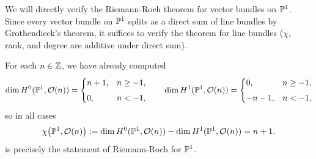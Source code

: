 \documentclass[12pt]{article}
\begin{document}
\begin{example}
     We will directly verify the Riemann-Roch theorem for vector bundles on $\P^1$. Since every vector bundle on $\P^1$ splits as a direct sum of line bundles by Grothendieck's theorem, it suffices to verify the theorem for line bundles ($\chi$, rank, and degree are additive under direct sum).


    For each $n\in\Z$, we have already computed
    \[
        \dim H^{0}(\P^{1},\cO(n)) =
        \begin{cases}
            n+1, & n\ge -1, \\[4pt]
            0,   & n<-1,
        \end{cases}
        \qquad
        \dim H^{1}(\P^{1},\cO(n)) =
        \begin{cases}
            0,    & n\ge -1, \\[4pt]
            -n-1, & n<-1,
        \end{cases}
    \]
    so in all cases
    \[
        \chi\bigl(\P^{1},\cO(n)\bigr)
        := \dim H^{0}(\P^{1},\cO(n)) - \dim H^{1}(\P^{1},\cO(n))
        = n+1.
    \]
    is precisely the statement of Riemann-Roch for $\P^1$.
\end{example}
\end{document}
